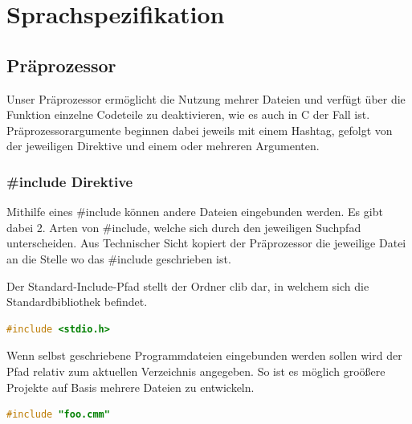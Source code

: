 

\newpage
\section{Sprachspezifikation}

\subsection{Pr\"aprozessor}

Unser Pr\"aprozessor erm\"oglicht die Nutzung mehrer Dateien und verf\"ugt \"uber die Funktion einzelne Codeteile zu deaktivieren, wie es auch in C der Fall ist. Pr\"aprozessorargumente beginnen dabei jeweils mit einem Hashtag, gefolgt von der jeweiligen Direktive und einem oder mehreren Argumenten.

\subsubsection{\#include Direktive}

Mithilfe eines \#include k\"onnen andere Dateien eingebunden werden. Es gibt dabei 2. Arten von \#include, welche sich durch den jeweiligen Suchpfad unterscheiden. Aus Technischer Sicht kopiert der Pr\"aprozessor die jeweilige Datei an die Stelle wo das \#include geschrieben ist.


Der Standard-Include-Pfad stellt der Ordner clib dar, in welchem sich die Standardbibliothek befindet.

\begin{lstlisting}[language=C]
#include <stdio.h>
\end{lstlisting}


Wenn selbst geschriebene Programmdateien eingebunden werden sollen wird der Pfad relativ zum aktuellen Verzeichnis angegeben. So ist es m\"oglich gro\"o\ss{}ere Projekte auf Basis mehrere Dateien zu entwickeln.

\begin{lstlisting}[language=C]
#include "foo.cmm"
\end{lstlisting}

